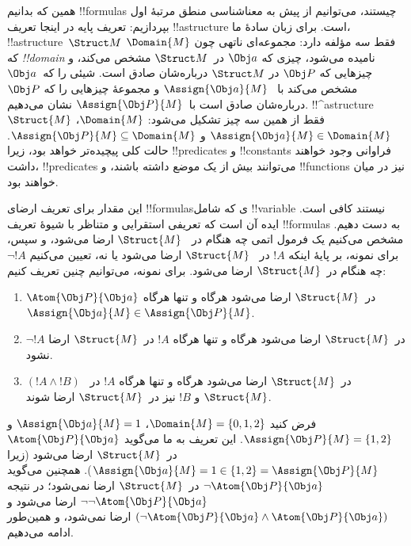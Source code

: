 \documentclass[../../../include/open-logic-section]{subfiles}
\begin{document}


همین که بدانیم !!{formula}s چیستند، می‌توانیم از پیش به معناشناسی منطق
مرتبهٔ اول بپردازیم: تعریف پایه در اینجا تعریف !!a{structure} است. برای
زبان سادهٔ ما، !!a{structure}~$\Struct M$ فقط سه مؤلفه دارد: مجموعه‌ای
ناتهی چون $\Domain{M}$ که \emph{!!{domain}} نامیده می‌شود، چیزی که
$\Obj a$ در~$\Struct M$ مشخص می‌کند، و چیزهایی که $\Obj P$ در
$\Struct M$ درباره‌شان صادق است. شیئی را که~$\Obj a$ مشخص می‌کند با
~$\Assign{\Obj a}{M}$ و مجموعهٔ چیزهایی را که $\Obj P$ درباره‌شان صادق
است با~$\Assign{\Obj P}{M}$ نشان می‌دهیم. !!^a{structure}~$\Struct{M}$
فقط از همین سه چیز تشکیل می‌شود: $\Domain{M}$،
$\Assign{\Obj a}{M} \in \Domain{M}$ و
$\Assign{\Obj P}{M} \subseteq \Domain{M}$. حالت کلی پیچیده‌تر خواهد
بود، زیرا !!{predicate}s و !!{constant}s فراوانی وجود خواهند داشت،
!!{predicate}s می‌توانند بیش از یک موضع داشته باشند، و !!{function}s
نیز در میان خواهند بود.

این مقدار برای تعریف ارضای !!{formula}sی که شامل !!{variable} نیستند
کافی است. ایده آن است که تعریفی استقرایی و متناظر با شیوهٔ تعریف
!!{formula}s به دست دهیم. مشخص می‌کنیم یک فرمول اتمی چه هنگام در
~$\Struct{M}$ ارضا می‌شود، و سپس، برای نمونه، بر پایهٔ اینکه $!A$ در
~$\Struct{M}$ ارضا می‌شود یا نه، تعیین می‌کنیم $\lnot !A$ چه هنگام
در~$\Struct{M}$ ارضا می‌شود. برای نمونه، می‌توانیم چنین تعریف کنیم:
\begin{enumerate}
  \item $\Atom{\Obj P}{\Obj a}$ در~$\Struct{M}$ ارضا می‌شود هرگاه و
  تنها هرگاه $\Assign{\Obj a}{M} \in \Assign{\Obj P}{M}$.
  \item $\lnot !A$ در~$\Struct{M}$ ارضا می‌شود هرگاه و تنها هرگاه
  $!A$ در~$\Struct{M}$ ارضا نشود.
  \item $(!A \land !B)$ در~$\Struct{M}$ ارضا می‌شود هرگاه و تنها
  هرگاه $!A$ در~$\Struct{M}$ و $!B$ نیز در~$\Struct{M}$ ارضا شوند.
\end{enumerate}
فرض کنید $\Domain{M} = \{0, 1, 2\}$، $\Assign{\Obj a}{M} = 1$ و
$\Assign{\Obj P}{M} = \{1, 2\}$. این تعریف به ما می‌گوید
$\Atom{\Obj P}{\Obj a}$ در~$\Struct{M}$ ارضا می‌شود (زیرا
$\Assign{\Obj a}{M} =  1 \in \{1,2\} = \Assign{\Obj P}{M}$). همچنین
می‌گوید $\lnot \Atom{\Obj P}{\Obj a}$ در~$\Struct{M}$ ارضا نمی‌شود؛
در نتیجه $\lnot\lnot \Atom{\Obj P}{\Obj a}$ ارضا می‌شود و
$(\lnot \Atom{\Obj P}{\Obj a} \land \Atom{\Obj P}{\Obj a})$ ارضا
نمی‌شود، و همین‌طور ادامه می‌دهیم.
\end{document}
